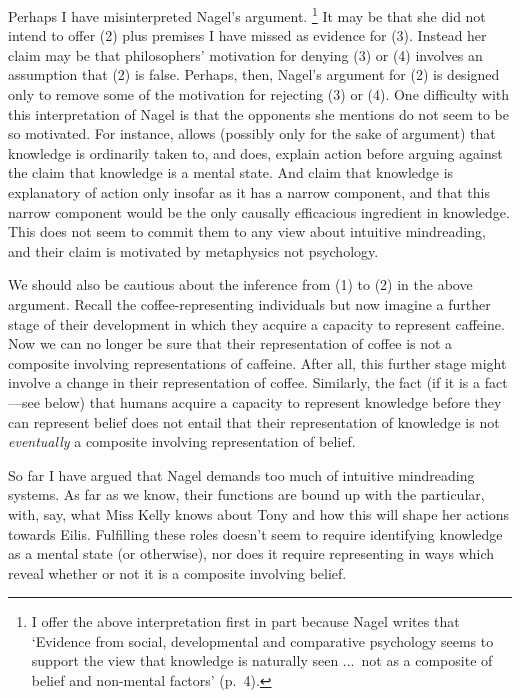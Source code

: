 \documentclass[12pt,\papersize]{extarticle}
\begin{document}
Perhaps I have misinterpreted Nagel's argument.%
\footnote{
I offer the above interpretation first in part because
Nagel writes that
`Evidence from social, developmental and comparative psychology seems to support the view that knowledge is naturally seen  ...\ not as a composite of belief and non-mental factors' (p.\ 4).
}
It may be that she did not intend to offer (2) plus premises I have missed as evidence for  (3).
Instead her claim may be that
philosophers' motivation for denying (3) or (4) 
involves an assumption that (2) is false.
Perhaps, then, Nagel's argument for (2) is  designed only to remove some of the motivation for rejecting (3) or (4).
One difficulty with this interpretation of Nagel is that the opponents she mentions do not seem to be so motivated.
For instance, 
 \citet[p.\ 35]{fricker_2009} allows (possibly only for the sake of argument) that knowledge  is ordinarily taken to, and does, explain action 
before arguing against
 the claim that knowledge is a mental state.
And \citet[pp.\ 39-40]{magnus_williamson_2003}
claim that knowledge is explanatory of action only insofar  as it has a narrow component,
and that this narrow component would be the only causally efficacious ingredient in knowledge.
This does not seem to commit them to any view about intuitive mindreading, 
and their claim is motivated by metaphysics not psychology.

We should also be cautious about the inference from (1) to (2) in the above argument.
Recall the coffee-representing individuals but now imagine a further stage of their development in which they acquire a capacity to represent caffeine.
Now we can no longer be sure that their representation of coffee is not a composite involving representations of caffeine.
After all, this further stage might involve a change in their representation of coffee.
Similarly, the fact (if it is a fact---see below) that humans acquire a capacity to represent knowledge before they can represent belief does not entail that their representation of knowledge is not \emph{eventually} a composite involving representation of belief.

So far I have argued that Nagel demands too much of intuitive mindreading systems.
As far as we know, their functions are bound up with the particular, with, say, what Miss Kelly knows about Tony and how this will shape her actions towards Eilis.
Fulfilling these roles doesn't seem to require identifying knowledge as a mental state (or otherwise),
nor does it require representing in ways which reveal whether or not it is a composite involving belief.
\end{document}
